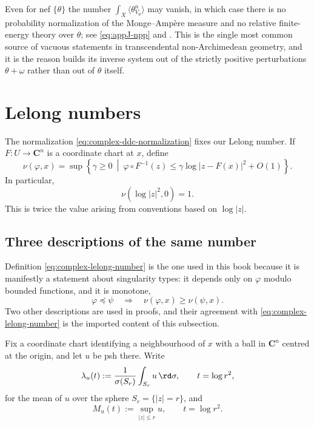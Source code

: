 \begin{remark}
\label{rem:ch51-zero-volume}
Even for nef \(\{\theta\}\) the number \(\int_X\langle\theta_{V_\theta}^n
\rangle\) may vanish, in which case there is no probability
normalization of the Monge--Amp\`ere measure and no relative finite-energy
theory over \(\theta\); see \eqref{eq:appJ-npp} and
.  This is the single most common source of
vacuous statements in transcendental non-Archimedean geometry, and it is
the reason  builds its inverse system out
of the strictly positive perturbations \(\theta+\omega\) rather than out of
\(\theta\) itself.
\end{remark}

\section{Lelong numbers}
\label{sec:ch51-lelong}

The normalization \eqref{eq:complex-ddc-normalization} fixes our Lelong
number.  If \(F:U\to\mathbf C^n\) is a coordinate chart at \(x\), define
\[
 \nu(\varphi,x)
 =\sup\left\{\gamma\geq0\ \middle|\ 
 \varphi\circ F^{-1}(z)
 \leq\gamma\log|z-F(x)|^2+O(1)\right\}.
\tag{51.6}\label{eq:complex-lelong-number}
\]
In particular,
\[
                         \nu(\log|z|^2,0)=1.
\tag{51.7}\label{eq:complex-lelong-model}
\]
This is twice the value arising from conventions based on \(\log|z|\).

\subsection{Three descriptions of the same number}
\label{sec:ch51-lelong-three}

Definition \eqref{eq:complex-lelong-number} is the one used in this book
because it is manifestly a statement about singularity types: it depends
only on \(\varphi\) modulo bounded functions, and it is monotone,
\[
 \varphi\preceq\psi
 \quad\Longrightarrow\quad
 \nu(\varphi,x)\geq\nu(\psi,x).
\]
Two other descriptions are used in proofs, and their agreement with
\eqref{eq:complex-lelong-number} is the imported content of this
subsection.

Fix a coordinate chart identifying a neighbourhood of \(x\) with a ball in
\(\mathbf C^n\) centred at the origin, and let \(u\) be psh there.  Write
\[
 \lambda_u(t)
 :=\frac{1}{\sigma(S_r)}\int_{S_r}u\,\rd\sigma,
 \qquad
 t=\log r^2,
\]
for the mean of \(u\) over the sphere \(S_r=\{|z|=r\}\), and
\[
 M_u(t):=\sup_{|z|\leq r}u,\qquad t=\log r^2 .
\]

